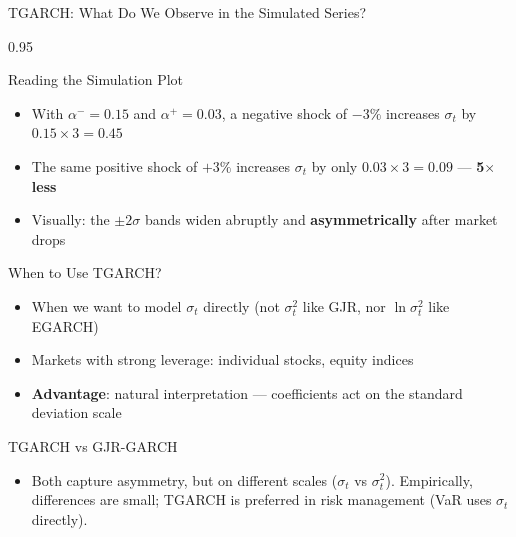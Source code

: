 \documentclass[9pt, aspectratio=169, t]{beamer}
\begin{document}
\begin{frame}{TGARCH: What Do We Observe in the Simulated Series?}
    \begin{cminipage}{0.95\textwidth}
    {\footnotesize
        \begin{block}{Reading the Simulation Plot}
            \begin{itemize}\setlength{\itemsep}{0pt}
                \item With $\alpha^- = 0.15$ and $\alpha^+ = 0.03$, a negative shock of $-3\%$ increases $\sigma_t$ by $0.15 \times 3 = 0.45$
                \item The same positive shock of $+3\%$ increases $\sigma_t$ by only $0.03 \times 3 = 0.09$ --- \textbf{5$\times$ less}
                \item Visually: the $\pm 2\sigma$ bands widen abruptly and \textbf{asymmetrically} after market drops
            \end{itemize}
        \end{block}
        \begin{exampleblock}{When to Use TGARCH?}
            \begin{itemize}\setlength{\itemsep}{0pt}
                \item When we want to model $\sigma_t$ directly (not $\sigma_t^2$ like GJR, nor $\ln\sigma_t^2$ like EGARCH)
                \item Markets with strong leverage: individual stocks, equity indices
                \item \textbf{Advantage}: natural interpretation --- coefficients act on the standard deviation scale
            \end{itemize}
        \end{exampleblock}
        \begin{alertblock}{TGARCH vs GJR-GARCH}
            \begin{itemize}\setlength{\itemsep}{0pt}
                \item Both capture asymmetry, but on different scales ($\sigma_t$ vs $\sigma_t^2$). Empirically, differences are small; TGARCH is preferred in risk management (VaR uses $\sigma_t$ directly).
            \end{itemize}
        \end{alertblock}
    }
    \end{cminipage}
\end{frame}
\end{document}
